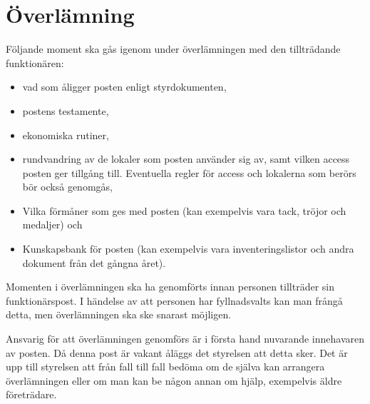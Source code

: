 \documentclass{dsekguideline}
\begin{document}
\section{Överlämning}
\begin{parasection}

Följande moment ska gås igenom under överlämningen med den tillträdande
funktionären:
\begin{itemize}
    \item vad som åligger posten enligt styrdokumenten,
    \item postens testamente,
    \item ekonomiska rutiner,
    \item rundvandring av de lokaler som posten använder sig av, samt vilken
      access posten ger tillgång till. Eventuella regler för access och
      lokalerna som berörs bör också genomgås,
    \item Vilka förmåner som ges med posten (kan exempelvis vara tack, tröjor
      och medaljer) och
    \item Kunskapsbank för posten (kan exempelvis vara inventeringslistor och
      andra dokument från det gångna året).
\end{itemize}
Momenten i överlämningen ska ha genomförts innan personen tillträder sin
funktionärspost. I händelse av att personen har fyllnadsvalts kan man frångå
detta, men överlämningen ska ske snarast möjligen.

Ansvarig för att överlämningen genomförs är i första hand nuvarande innehavaren
av posten. Då denna post är vakant åläggs det styrelsen att detta sker. Det är
upp till styrelsen att från fall till fall bedöma om de själva kan arrangera
överlämningen eller om man kan be någon annan om hjälp, exempelvis äldre
företrädare.

\end{parasection}
\end{document}
